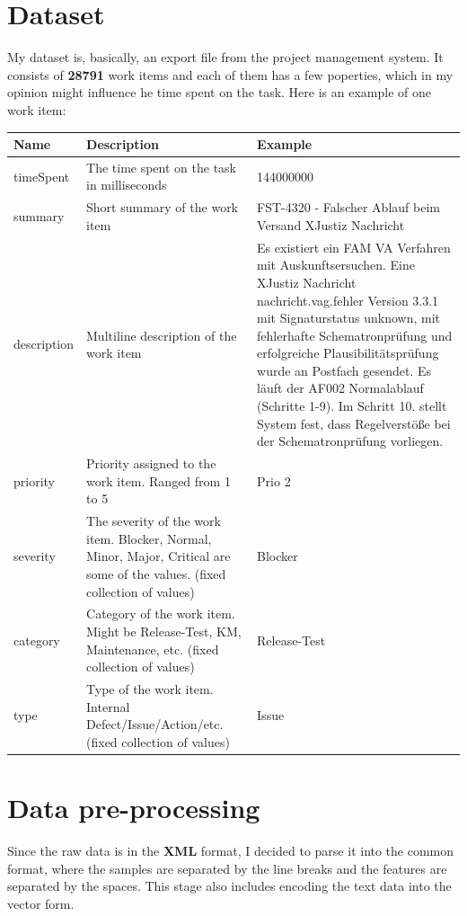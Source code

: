 \documentclass{article}
\begin{document}
\section{Dataset}
My dataset is, basically, an export file from the project management system. It consists of \textbf{28791} work items 
and each of them has a few poperties, which in my opinion might influence he time spent on the task. Here is an example
of one work item:
\begin{center}
    \begin{longtable}[H]{ | m{5em} | m{10em}| m{20em} | }  
        \hline
        Name & Description & Example \\
        \hline\hline
        timeSpent & The time spent on the task in milliseconds & 144000000 \\
        \hline
        summary & Short summary of the work item & FST-4320 - Falscher Ablauf beim Versand XJustiz Nachricht \\
        \hline
        description & Multiline description of the work item & 
        Es existiert ein FAM VA Verfahren mit Auskunftsersuchen. Eine XJustiz Nachricht nachricht.vag.fehler Version 3.3.1 mit Signaturstatus unknown, mit fehlerhafte Schematronprüfung und erfolgreiche Plausibilitätsprüfung wurde an Postfach gesendet.
        Es läuft der AF002 Normalablauf (Schritte 1-9). Im Schritt 10. stellt System fest, dass Regelverstöße bei der Schematronprüfung vorliegen. \\
        \hline
        priority & Priority assigned to the work item. Ranged from 1 to 5 & Prio 2 \\
        \hline
        severity & The severity of the work item. Blocker, Normal, Minor, Major, Critical are some of the values. (fixed collection of values) & Blocker \\
        \hline
        category & Category of the work item. Might be Release-Test, KM, Maintenance, etc. (fixed collection of values) & Release-Test \\
        \hline
        type & Type of the work item. Internal Defect/Issue/Action/etc. (fixed collection of values) & Issue \\
        \hline
\end{longtable}
\end{center}
    
\section{Data pre-processing}
Since the raw data is in the \textbf{XML} format, I decided to parse it into the common format, where the samples
are separated by the line breaks and the features are separated by the spaces. This stage also includes encoding
the text data into the vector form.
\end{document}
